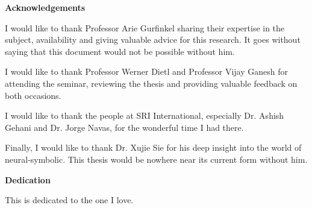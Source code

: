 \cleardoublepage


\begin{center}\textbf{Acknowledgements}\end{center}
I would like to thank Professor Arie Gurfinkel sharing their  expertise  in  the  subject,  availability  and  giving  valuable  advice  for  this  research. It goes without saying that this document would not be possible without him. 

I would like to thank Professor Werner Dietl and Professor Vijay Ganesh for attending the seminar, reviewing the thesis and providing valuable feedback on both occasions. 

I would like to thank the people at SRI International, especially Dr. Ashish Gehani and Dr. Jorge Navas, for the wonderful time I had there.

Finally, I would like to thank Dr. Xujie Sie for his deep insight into the world of neural-symbolic. This thesis would be nowhere near its current form without him.
\cleardoublepage


\begin{center}\textbf{Dedication}\end{center}

This is dedicated to the one I love.
\cleardoublepage

\renewcommand\contentsname{Table of Contents}
\tableofcontents
\cleardoublepage
{}    %

\listoftables
\cleardoublepage
{}		%

\listoffigures
\cleardoublepage
{}		%

\printglossaries
\cleardoublepage
{}		%


